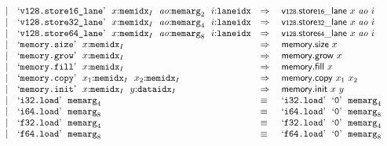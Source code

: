$$\begin{array}[t]{@{}lrrl@{}l@{}l@{}l@{}}
& & | & \mbox{‘\texttt{v128.store16\_lane}’}~~x{:}{{\mathtt{memidx}}}_{I}~~{\mathit{ao}}{:}{{\mathtt{memarg}}}_{2}~~i{:}{\mathtt{laneidx}} & \quad\Rightarrow\quad{} & {\mathsf{v{\scriptstyle 128}}{.}\mathsf{store}}{\mathsf{{\scriptstyle 16}}}{\mathsf{\_}}{\mathsf{lane}}~x~{\mathit{ao}}~i \\
& & | & \mbox{‘\texttt{v128.store32\_lane}’}~~x{:}{{\mathtt{memidx}}}_{I}~~{\mathit{ao}}{:}{{\mathtt{memarg}}}_{4}~~i{:}{\mathtt{laneidx}} & \quad\Rightarrow\quad{} & {\mathsf{v{\scriptstyle 128}}{.}\mathsf{store}}{\mathsf{{\scriptstyle 32}}}{\mathsf{\_}}{\mathsf{lane}}~x~{\mathit{ao}}~i \\
& & | & \mbox{‘\texttt{v128.store64\_lane}’}~~x{:}{{\mathtt{memidx}}}_{I}~~{\mathit{ao}}{:}{{\mathtt{memarg}}}_{8}~~i{:}{\mathtt{laneidx}} & \quad\Rightarrow\quad{} & {\mathsf{v{\scriptstyle 128}}{.}\mathsf{store}}{\mathsf{{\scriptstyle 64}}}{\mathsf{\_}}{\mathsf{lane}}~x~{\mathit{ao}}~i \\
& & | & \mbox{‘\texttt{memory.size}’}~~x{:}{{\mathtt{memidx}}}_{I} & \quad\Rightarrow\quad{} & \mathsf{memory{.}size}~x \\
& & | & \mbox{‘\texttt{memory.grow}’}~~x{:}{{\mathtt{memidx}}}_{I} & \quad\Rightarrow\quad{} & \mathsf{memory{.}grow}~x \\
& & | & \mbox{‘\texttt{memory.fill}’}~~x{:}{{\mathtt{memidx}}}_{I} & \quad\Rightarrow\quad{} & \mathsf{memory{.}fill}~x \\
& & | & \mbox{‘\texttt{memory.copy}’}~~x_1{:}{{\mathtt{memidx}}}_{I}~~x_2{:}{{\mathtt{memidx}}}_{I} & \quad\Rightarrow\quad{} & \mathsf{memory{.}copy}~x_1~x_2 \\
& & | & \mbox{‘\texttt{memory.init}’}~~x{:}{{\mathtt{memidx}}}_{I}~~y{:}{{\mathtt{dataidx}}}_{I} & \quad\Rightarrow\quad{} & \mathsf{memory{.}init}~x~y \\
& & | & \mbox{‘\texttt{i32.load}’}~~{{\mathtt{memarg}}}_{4} & \quad\equiv\quad{} & \mbox{‘\texttt{i32.load}’}~~\mbox{‘\texttt{0}’}~~{{\mathtt{memarg}}}_{4} \\
& & | & \mbox{‘\texttt{i64.load}’}~~{{\mathtt{memarg}}}_{8} & \quad\equiv\quad{} & \mbox{‘\texttt{i64.load}’}~~\mbox{‘\texttt{0}’}~~{{\mathtt{memarg}}}_{8} \\
& & | & \mbox{‘\texttt{f32.load}’}~~{{\mathtt{memarg}}}_{4} & \quad\equiv\quad{} & \mbox{‘\texttt{f32.load}’}~~\mbox{‘\texttt{0}’}~~{{\mathtt{memarg}}}_{4} \\
& & | & \mbox{‘\texttt{f64.load}’}~~{{\mathtt{memarg}}}_{8} & \quad\equiv\quad{} & \mbox{‘\texttt{f64.load}’}~~\mbox{‘\texttt{0}’}~~{{\mathtt{memarg}}}_{8} \\

\end{array}$$
